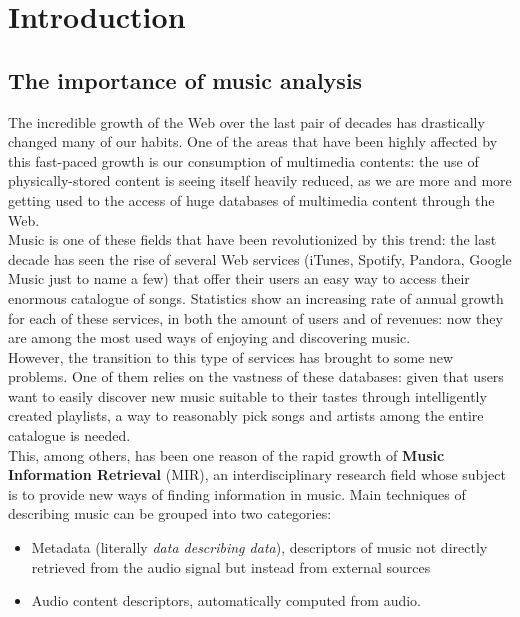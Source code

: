 
\chapter{Introduction} %

\label{Chapter1} %



\section{The importance of music analysis}
The incredible growth of the Web over the last pair of decades has drastically changed many of our habits. One of the areas that have been highly affected by this fast-paced growth is our consumption of multimedia contents: the use of physically-stored content is seeing itself heavily reduced, as we are more and more getting used to the access of huge databases of multimedia content through the Web.\\
Music is one of these fields that have been revolutionized by this trend: the last decade has seen the rise of several Web services (iTunes, Spotify, Pandora, Google Music just to name a few) that offer their users an easy way to access their enormous catalogue of songs. Statistics show an increasing rate of annual growth for each of these services, in both the amount of users and of revenues: now they are among the most used ways of enjoying and discovering music. \\
However, the transition to this type of services has brought to some new problems. One of them relies on the vastness of these databases: given that users want to easily discover new music suitable to their tastes through intelligently created playlists, a way to reasonably pick songs and artists among the entire catalogue is needed. \\
This, among others, has been one reason of the rapid growth of \textbf{Music Information Retrieval} (MIR), an interdisciplinary research field whose subject is to provide new ways of finding information in music. Main techniques of describing music can be grouped into two categories: 
\begin{itemize}
\item Metadata (literally \textit{data describing data}), descriptors of music not directly retrieved from the audio signal but instead from external sources
\item Audio content descriptors, automatically computed from audio.
\end{itemize}
